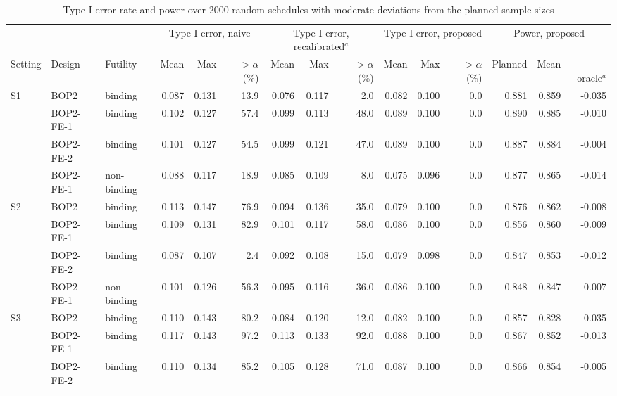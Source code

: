 \begin{table}
\centering
\caption{Type I error rate and power over 2000 random schedules with moderate deviations from the planned sample sizes}
\label{tab:random}
\scriptsize
\setlength{\tabcolsep}{3pt}
\begin{tabular}{lllrrrrrrrrrrrr}
\toprule
 & & & \multicolumn{3}{c}{Type I error, naive} & \multicolumn{3}{c}{Type I error, recalibrated$^{a}$} & \multicolumn{3}{c}{Type I error, proposed} & \multicolumn{3}{c}{Power, proposed} \\
\cmidrule(lr){4-6}\cmidrule(lr){7-9}\cmidrule(lr){10-12}\cmidrule(lr){13-15}
Setting & Design & Futility & Mean & Max & $>\alpha$ (\%) & Mean & Max & $>\alpha$ (\%) & Mean & Max & $>\alpha$ (\%) & Planned & Mean & $-$ oracle$^{a}$ \\
\midrule
S1 & BOP2 & binding & 0.087 & 0.131 & 13.9 & 0.076 & 0.117 & 2.0 & 0.082 & 0.100 & 0.0 & 0.881 & 0.859 & -0.035 \\
 & BOP2-FE-1 & binding & 0.102 & 0.127 & 57.4 & 0.099 & 0.113 & 48.0 & 0.089 & 0.100 & 0.0 & 0.890 & 0.885 & -0.010 \\
 & BOP2-FE-2 & binding & 0.101 & 0.127 & 54.5 & 0.099 & 0.121 & 47.0 & 0.089 & 0.100 & 0.0 & 0.887 & 0.884 & -0.004 \\
 & BOP2-FE-1 & non-binding & 0.088 & 0.117 & 18.9 & 0.085 & 0.109 & 8.0 & 0.075 & 0.096 & 0.0 & 0.877 & 0.865 & -0.014 \\
\midrule
S2 & BOP2 & binding & 0.113 & 0.147 & 76.9 & 0.094 & 0.136 & 35.0 & 0.079 & 0.100 & 0.0 & 0.876 & 0.862 & -0.008 \\
 & BOP2-FE-1 & binding & 0.109 & 0.131 & 82.9 & 0.101 & 0.117 & 58.0 & 0.086 & 0.100 & 0.0 & 0.856 & 0.860 & -0.009 \\
 & BOP2-FE-2 & binding & 0.087 & 0.107 & 2.4 & 0.092 & 0.108 & 15.0 & 0.079 & 0.098 & 0.0 & 0.847 & 0.853 & -0.012 \\
 & BOP2-FE-1 & non-binding & 0.101 & 0.126 & 56.3 & 0.095 & 0.116 & 36.0 & 0.086 & 0.100 & 0.0 & 0.848 & 0.847 & -0.007 \\
\midrule
S3 & BOP2 & binding & 0.110 & 0.143 & 80.2 & 0.084 & 0.120 & 12.0 & 0.082 & 0.100 & 0.0 & 0.857 & 0.828 & -0.035 \\
 & BOP2-FE-1 & binding & 0.117 & 0.143 & 97.2 & 0.113 & 0.133 & 92.0 & 0.088 & 0.100 & 0.0 & 0.867 & 0.852 & -0.013 \\
 & BOP2-FE-2 & binding & 0.110 & 0.134 & 85.2 & 0.105 & 0.128 & 71.0 & 0.087 & 0.100 & 0.0 & 0.866 & 0.854 & -0.005 \\

\end{tabular}
\end{table}

